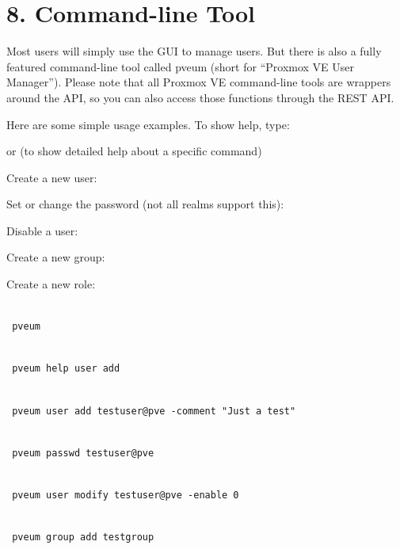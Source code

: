 \section{8. Command-line Tool}

Most users will simply use the GUI to manage users. But there is also a fully featured command-line tool called pveum (short for “Proxmox VE User Manager”). Please note that all Proxmox VE command-line tools are wrappers around the API, so you can also access those functions through the REST API.

Here are some simple usage examples. To show help, type:

or (to show detailed help about a specific command)

Create a new user:

Set or change the password (not all realms support this):

Disable a user:

Create a new group:

Create a new role:

\begin{lstlisting}

 pveum

\end{lstlisting}

\begin{lstlisting}

 pveum help user add

\end{lstlisting}

\begin{lstlisting}

 pveum user add testuser@pve -comment "Just a test"

\end{lstlisting}

\begin{lstlisting}

 pveum passwd testuser@pve

\end{lstlisting}

\begin{lstlisting}

 pveum user modify testuser@pve -enable 0

\end{lstlisting}

\begin{lstlisting}

 pveum group add testgroup

\end{lstlisting}

